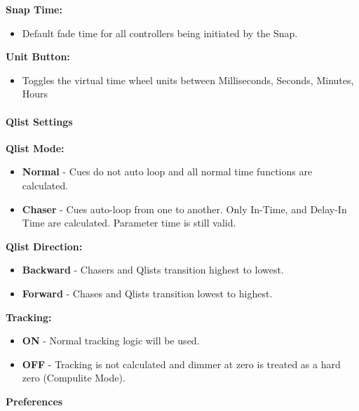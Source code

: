 \documentclass[
]{article}
\providecommand{\tightlist}{%
  \setlength{\itemsep}{0pt}\setlength{\parskip}{0pt}}
\begin{document}
\textbf{Snap Time:}

\begin{itemize}
\tightlist
\item
  Default fade time for all controllers being initiated by the Snap.
\end{itemize}

\textbf{Unit Button:}

\begin{itemize}
\tightlist
\item
  Toggles the virtual time wheel units between Milliseconds, Seconds, Minutes, Hours
\end{itemize}

\hypertarget{qlist-settings}{%
\paragraph{Qlist Settings}\label{qlist-settings}}

\textbf{Qlist Mode:}

\begin{itemize}
\item
  \textbf{Normal} - Cues do not auto loop and all normal time functions are calculated.
\item
  \textbf{Chaser} - Cues auto-loop from one to another. Only In-Time, and Delay-In Time are calculated. Parameter time is still valid.
\end{itemize}

\textbf{Qlist Direction:}

\begin{itemize}
\item
  \textbf{Backward} - Chasers and Qlists transition highest to lowest.
\item
  \textbf{Forward} - Chases and Qlists transition lowest to highest.
\end{itemize}

\textbf{Tracking:}

\begin{itemize}
\item
  \textbf{ON} - Normal tracking logic will be used.
\item
  \textbf{OFF} - Tracking is not calculated and dimmer at zero is treated as a hard zero (Compulite Mode).
\end{itemize}

\textbf{Preferences}
\end{document}
